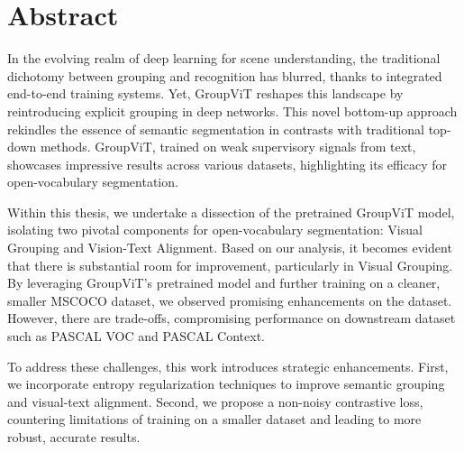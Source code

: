 \chapter*{Abstract}
In the evolving realm of deep learning for scene understanding, the traditional dichotomy between grouping and recognition has blurred, thanks to integrated end-to-end training systems. Yet, GroupViT reshapes this landscape by reintroducing explicit grouping in deep networks. This novel bottom-up approach rekindles the essence of semantic segmentation in contrasts with traditional top-down methods. GroupViT, trained on weak supervisory signals from text, showcases impressive results across various datasets, highlighting its efficacy for open-vocabulary segmentation. 


Within this thesis, we undertake a dissection of the pretrained GroupViT model, isolating two pivotal components for open-vocabulary segmentation: Visual Grouping and Vision-Text Alignment. Based on our analysis, it becomes evident that there is substantial room for improvement, particularly in Visual Grouping. By leveraging GroupViT’s pretrained model and further training on a cleaner, smaller MSCOCO dataset, we observed promising enhancements on the dataset. However, there are trade-offs, compromising performance on downstream dataset such as PASCAL VOC and PASCAL Context.

To address these challenges, this work introduces strategic enhancements. First, we incorporate entropy regularization techniques to improve semantic grouping and visual-text alignment. Second, we propose a non-noisy contrastive loss, countering limitations of training on a smaller dataset and leading to more robust, accurate results.

